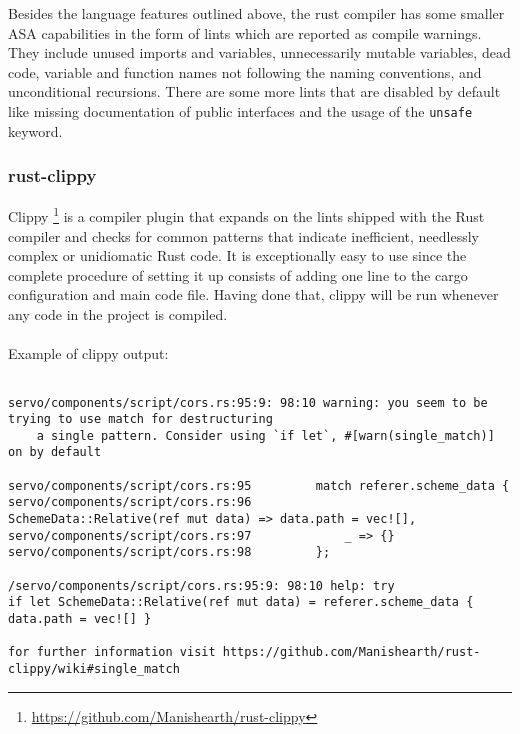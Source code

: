 \documentclass{scrartcl}
\begin{document}
Besides the language features outlined above, the rust compiler has some smaller ASA capabilities in the form of lints which are reported as compile warnings. They include unused imports and variables, unnecessarily mutable variables, dead code, variable and function names not following the naming conventions, and unconditional recursions. There are some more lints that are disabled by default like missing documentation of public interfaces and the usage of the \texttt{unsafe} keyword.

\subsubsection{rust-clippy}

Clippy \footnote{\url{https://github.com/Manishearth/rust-clippy}} is a compiler plugin that expands on the lints shipped with the Rust compiler and checks for common patterns that indicate inefficient, needlessly complex or unidiomatic Rust code. It is exceptionally easy to use since the complete procedure of setting it up consists of adding one line to the cargo configuration and main code file. Having done that, clippy will be run whenever any code in the project is compiled.\\
\\

Example of clippy output:
{
\scriptsize
\begin{verbatim}

servo/components/script/cors.rs:95:9: 98:10 warning: you seem to be trying to use match for destructuring
    a single pattern. Consider using `if let`, #[warn(single_match)] on by default
    
servo/components/script/cors.rs:95         match referer.scheme_data {
servo/components/script/cors.rs:96             SchemeData::Relative(ref mut data) => data.path = vec![],
servo/components/script/cors.rs:97             _ => {}
servo/components/script/cors.rs:98         };

/servo/components/script/cors.rs:95:9: 98:10 help: try
if let SchemeData::Relative(ref mut data) = referer.scheme_data { data.path = vec![] }

for further information visit https://github.com/Manishearth/rust-clippy/wiki#single_match

\end{verbatim}
}
\end{document}
